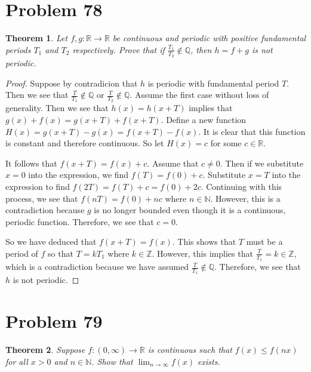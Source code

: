 \documentclass[psamsfonts]{amsart}
\newtheorem{thm}{Theorem}[section]
\theoremstyle{definition}
\theoremstyle{remark}
\numberwithin{equation}{section}
\begin{document}
\section{Problem 78}

\begin{thm}
Let $f, g: \mathbb{R} \to \mathbb{R}$ be continuous and periodic with positive fundamental periods $T_1$ and $T_2$ respectively. Prove that if $\frac{T_1}{T_2} \notin \mathbb{Q}$, then $h = f+g$ is not periodic. 
\end{thm}

\begin{proof}
Suppose by contradicion that $h$ is periodic with fundamental period $T$. Then we see that $\frac{T}{T_1} \notin \mathbb{Q}$ or $\frac{T}{T_2} \notin \mathbb{Q}$. Assume the first case without loss of generality. Then we see that $h(x)  = h(x + T)$ implies that $g(x) + f(x) = g(x+T) + f(x+T)$. Define a new function $H(x) = g(x + T) - g(x) = f(x+T) - f(x)$. It is clear that this function is constant and therefore continuous. So let $H(x) = c$ for some $c \in \mathbb{R}$.

It follows that $f(x+T) = f(x) + c$. Assume that $ c \neq 0$. Then if we substitute $x =0$ into the expression, we find $f(T) = f(0) + c$. Substitute $x = T$ into the expression to find $f(2T) = f(T) + c = f(0) + 2c$. Continuing with this process, we see that $f(nT) = f(0) + nc$ where $n \in \mathbb{N}$. However, this is a contradiction because $g$ is no longer bounded even though it is a continuous, periodic function. Therefore, we see that $c = 0$. 

So we have deduced that $f(x+T) = f(x)$. This shows that $T$ must be a period of $f$ so that $T = kT_1$ where $k \in \mathbb{Z}$. However, this implies that $\frac{T}{T_1} = k \in \mathbb{Z}$, which is a contradiction because we have assumed $\frac{T}{T_1} \notin \mathbb{Q}$. Therefore, we see that $h$ is not periodic. 
\end{proof}

\section{Problem 79}

\begin{thm}
Suppose $f:(0,\infty) \to \mathbb{R}$ is continuous such that $f(x) \leq f(nx)$ for all $x > 0$ and $n \in \mathbb{N}$. Show that $\lim_{n \to \infty} f(x)$ exists. 
\end{thm}
\end{document}
